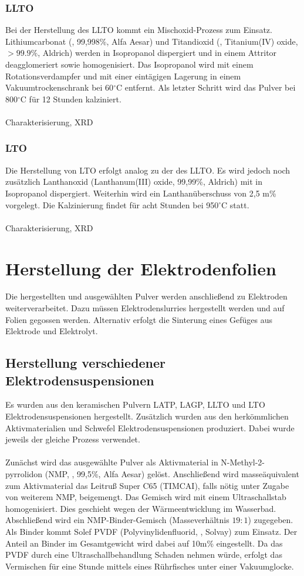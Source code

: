 \documentclass[a4paper, 11pt, headsepline,footsepline,twoside,abstract]{scrbook}
\begin{document}
\subsubsection{LLTO}
Bei der Herstellung des LLTO kommt ein Mischoxid-Prozess zum Einsatz. Lithiumcarbonat (, 99,998\%, Alfa Aesar) und Titandioxid (, Titanium(IV) oxide, $>99.9\%$, Aldrich) werden in Isopropanol dispergiert und in einem Attritor deagglomeriert sowie homogenisiert. Das Isopropanol wird mit einem Rotationsverdampfer und mit einer eintägigen Lagerung in einem Vakuumtrockenschrank bei 60$^\circ$C entfernt. Als letzter Schritt wird das Pulver bei 800$^\circ$C für 12 Stunden kalziniert.
\\\\
Charakterisierung, XRD
\subsubsection{LTO}
Die Herstellung von LTO erfolgt analog zu der des LLTO. Es wird jedoch noch zusätzlich Lanthanoxid (Lanthanum(III) oxide, 99,99\%, Aldrich) mit in Isopropanol dispergiert. Weiterhin wird ein Lanthanüberschuss von 2,5 m\% vorgelegt. Die Kalzinierung findet für acht Stunden bei 950$^\circ$C statt.
\\\\
Charakterisierung, XRD
\section{Herstellung der Elektrodenfolien}
Die hergestellten und ausgewählten Pulver werden anschließend zu Elektroden weiterverarbeitet. Dazu müssen Elektrodenslurries hergestellt werden und auf Folien gegossen werden. Alternativ erfolgt die Sinterung eines Gefüges aus Elektrode und Elektrolyt.
\subsection{Herstellung verschiedener Elektrodensuspensionen}
Es wurden aus den keramischen Pulvern LATP, LAGP, LLTO und LTO  Elektrodensuspensionen hergestellt. Zusätzlich wurden aus den herkömmlichen Aktivmaterialien  und Schwefel Elektrodensuspensionen produziert. Dabei wurde jeweils der gleiche Prozess verwendet. 
\\\\
Zunächst wird das ausgewählte Pulver als Aktivmaterial in N-Methyl-2-pyrrolidon (NMP, , 99,5\%, Alfa Aesar) gelöst. Anschließend wird masseäquivalent zum Aktivmaterial das Leitruß Super C65 (TIMCAI), falls nötig unter Zugabe von weiterem NMP, beigemengt. Das Gemisch wird mit einem Ultraschallstab homogenisiert. Dies geschieht wegen der Wärmeentwicklung im Wasserbad. Abschließend wird ein NMP-Binder-Gemisch (Masseverhältnis $19:1$) zugegeben. Als Binder kommt Solef PVDF (Polyvinylidenfluorid, , Solvay) zum Einsatz. Der Anteil an Binder im Gesamtgewicht wird dabei auf 10m\% eingestellt. Da das PVDF durch eine Ultraschallbehandlung Schaden nehmen würde, erfolgt das Vermischen für eine Stunde mittels eines Rührfisches unter einer Vakuumglocke.
\end{document}
